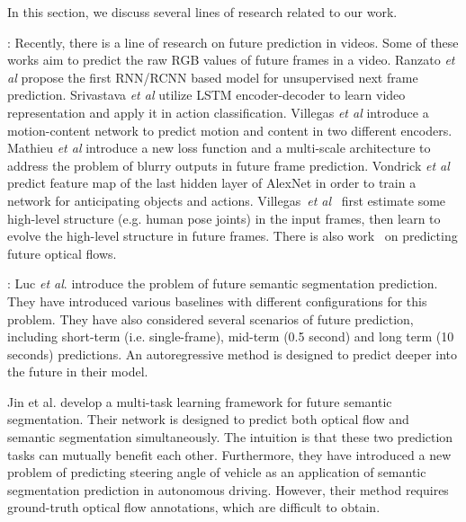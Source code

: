 \documentclass{bmvc2k}
\def\etal{\emph{et al}\bmvaOneDot}
\begin{document}
In this section, we discuss several lines of research related to our work.

: Recently, there is a line of research on future prediction in videos. Some of these works aim to predict the raw RGB values of future frames in a video. Ranzato \etal\cite{ranzato2014video} propose the first RNN/RCNN based model for unsupervised next frame prediction.  Srivastava \etal\cite{srivastava2015unsupervised} utilize LSTM \cite{hochreiter1997long} encoder-decoder to learn video representation and apply it in action classification. Villegas \etal\cite{villegas17mcnet} introduce a motion-content network to predict motion and content in two different encoders. Mathieu \etal\cite{mathieu2015deep} introduce a new loss function and a multi-scale architecture to address the problem of blurry outputs in future frame prediction. Vondrick \etal\cite{Vondrick_2016_CVPR} predict feature map of the last hidden layer of AlexNet \cite{krizhevsky2012imagenet} in order to train a network for anticipating objects and actions. Villegas~\etal~\cite{villegas2017learning} first estimate some high-level structure (e.g. human pose joints) in the input frames, then learn to evolve the high-level structure in future frames. There is also work~\cite{walker2015dense,PatrauceanHC16} on predicting future optical flows.

: Luc \etal. \cite{NextSegmPredICCV17} introduce the problem of future semantic segmentation prediction. They have introduced various baselines with different configurations for this problem. They have also considered several scenarios of future prediction, including short-term (i.e. single-frame), mid-term (0.5 second) and long term (10 seconds) predictions. An autoregressive method is designed to predict deeper into the future in their model. %

Jin et al.\cite{jin2017predicting} develop a multi-task learning framework for future semantic segmentation. Their network is designed to predict both optical flow and semantic segmentation simultaneously. The intuition is that these two prediction tasks can mutually benefit each other. Furthermore, they have introduced a new problem of predicting steering angle of vehicle as an application of semantic segmentation prediction in autonomous driving. However, their method requires ground-truth optical flow annotations, which are difficult to obtain.
\end{document}
